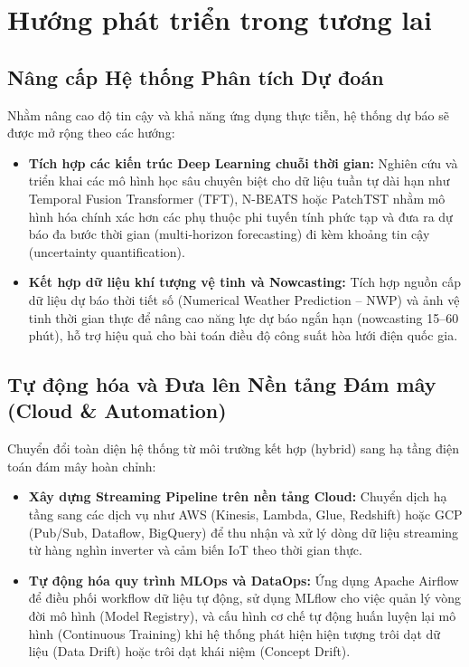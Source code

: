 \documentclass[12pt, a4paper]{report}
\begin{document}
\section{Hướng phát triển trong tương lai}
\label{sec:future_work}

\subsection{Nâng cấp Hệ thống Phân tích Dự đoán}
Nhằm nâng cao độ tin cậy và khả năng ứng dụng thực tiễn, hệ thống dự báo sẽ được mở rộng theo các hướng:
\begin{itemize}
    \item \textbf{Tích hợp các kiến trúc Deep Learning chuỗi thời gian:} Nghiên cứu và triển khai các mô hình học sâu chuyên biệt cho dữ liệu tuần tự dài hạn như Temporal Fusion Transformer (TFT), N-BEATS hoặc PatchTST nhằm mô hình hóa chính xác hơn các phụ thuộc phi tuyến tính phức tạp và đưa ra dự báo đa bước thời gian (multi-horizon forecasting) đi kèm khoảng tin cậy (uncertainty quantification).
    \item \textbf{Kết hợp dữ liệu khí tượng vệ tinh và Nowcasting:} Tích hợp nguồn cấp dữ liệu dự báo thời tiết số (Numerical Weather Prediction -- NWP) và ảnh vệ tinh thời gian thực để nâng cao năng lực dự báo ngắn hạn (nowcasting 15--60 phút), hỗ trợ hiệu quả cho bài toán điều độ công suất hòa lưới điện quốc gia.
\end{itemize}

\subsection{Tự động hóa và Đưa lên Nền tảng Đám mây (Cloud \& Automation)}
\label{sec:future_work_cloud}
Chuyển đổi toàn diện hệ thống từ môi trường kết hợp (hybrid) sang hạ tầng điện toán đám mây hoàn chỉnh:
\begin{itemize}
    \item \textbf{Xây dựng Streaming Pipeline trên nền tảng Cloud:} Chuyển dịch hạ tầng sang các dịch vụ như AWS (Kinesis, Lambda, Glue, Redshift) hoặc GCP (Pub/Sub, Dataflow, BigQuery) để thu nhận và xử lý dòng dữ liệu streaming từ hàng nghìn inverter và cảm biến IoT theo thời gian thực.
    \item \textbf{Tự động hóa quy trình MLOps và DataOps:} Ứng dụng Apache Airflow để điều phối workflow dữ liệu tự động, sử dụng MLflow cho việc quản lý vòng đời mô hình (Model Registry), và cấu hình cơ chế tự động huấn luyện lại mô hình (Continuous Training) khi hệ thống phát hiện hiện tượng trôi dạt dữ liệu (Data Drift) hoặc trôi dạt khái niệm (Concept Drift).
\end{itemize}
\newpage
\end{document}
